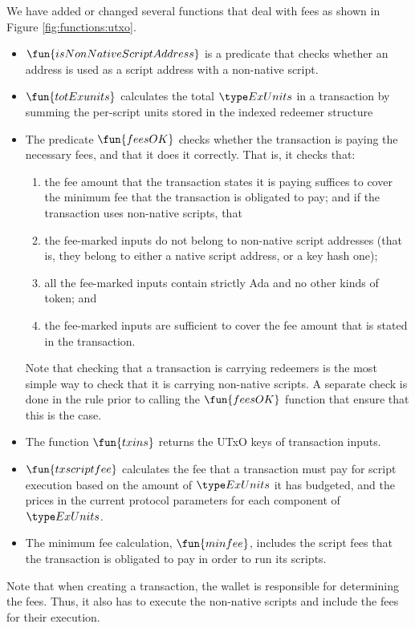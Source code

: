 We have added or changed several functions that deal with fees as shown in Figure \ref{fig:functions:utxo}.

\begin{itemize}
  \item $\fun{isNonNativeScriptAddress}$ is a predicate that checks
  whether an address is used as a script address with a non-native
  script.
  \item $\fun{totExunits}$ calculates the total $\ExUnits$ in a transaction by summing
  the per-script units stored in the indexed redeemer structure
  \item The predicate $\fun{feesOK}$ checks whether the transaction is
  paying the necessary fees, and that it does it correctly. That is, it checks that:
  \begin{enumerate}[label=({\roman*})]
    \item the fee amount that the transaction states it is paying suffices to cover
    the minimum fee that the transaction is obligated to pay; and if the transaction uses non-native scripts, that
    \item the fee-marked inputs do not belong to non-native script addresses (that is, they
    belong to either a native script address, or a key hash one);
    \item all the fee-marked inputs contain strictly Ada and no other kinds of token; and
    \item the fee-marked inputs are sufficient to cover the fee amount that is stated
    in the transaction.
  \end{enumerate}
  Note that checking that a transaction is carrying redeemers is the most simple way to
  check that it is carrying non-native scripts. A separate check is done in the rule prior to
  calling the $\fun{feesOK}$ function that ensure that this is the case.
  \item The function $\fun{txins}$ returns the UTxO keys of transaction inputs.
  \item $\fun{txscriptfee}$ calculates the fee that a transaction must pay for script
  execution based on the amount of $\ExUnits$ it has budgeted, and the prices in the current protocol parameters
  for each component of $\ExUnits$.
  \item The minimum fee calculation, $\fun{minfee}$, includes the script
  fees that the transaction is obligated to pay in order to run its scripts.
\end{itemize}

Note that when creating a transaction, the wallet is responsible for
determining the fees. Thus, it also has to execute the non-native scripts
and include the fees for their execution.

